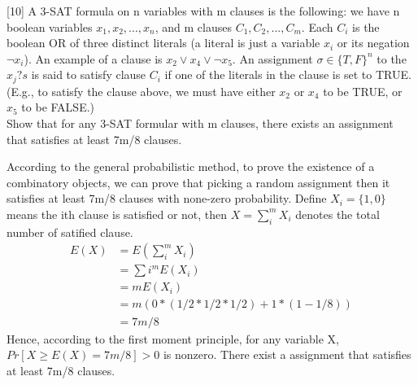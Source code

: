 \documentclass[addpoints]{exam}
\begin{document}
\begin{questions}

[10]
A 3-SAT formula on n variables with m clauses is the following: we have n boolean variables $x_1,x_2,...,x_n$, and m clauses $C_1,C_2,...,C_m$. Each $C_i$ is the boolean OR of three distinct literals (a literal is just a variable $x_i$ or its negation $\neg x_i$). An example of a clause is $x_2 \vee x_4 \vee \neg x_5$. An assignment $\sigma \in \{T,F\}^n$ to the $x_j?s$ is said to satisfy clause $C_i$ if one of the literals in the clause is set to TRUE. (E.g., to satisfy the clause above, we must have either $x_2$ or $x_4$ to be TRUE, or $x_5$ to be FALSE.) \\
Show that for any 3-SAT formular with m clauses, there exists an assignment that satisfies at least 7m/8 clauses. 
\begin{solution}
According to the general probabilistic method, to prove the existence of a combinatory objects, we can prove that picking a random assignment then it satisfies at least 7m/8 clauses with none-zero probability.
Define $X_i=\{1,0\}$ means the ith clause is satisfied or not, then $X= \sum_{i}^{m} X_i$ denotes the total number of satified clause.  \\
\begin{align*}
E(X) & = E(\sum_{i}^{m} X_i) \\
	& = \sum{i}^{m} E(X_i) \\
	& = m E(X_i) \\
	& = m (0*(1/2*1/2*1/2)+1*(1-1/8)) \\
	& = 7m/8 
\end{align*} 
Hence,  according to the first moment principle, for any variable X, $Pr[X \geq E(X) = 7m/8] > 0 $ is nonzero. There exist a assignment that satisfies at least 7m/8 clauses. 
\end{solution}


\end{questions}
\end{document}
